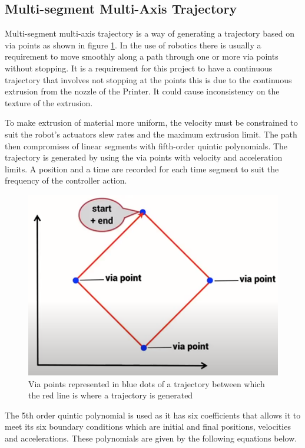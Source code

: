 \documentclass{UoNMCHA}
\numberwithin{equation}{section}
\begin{document}
	\subsection{Multi-segment Multi-Axis Trajectory}
Multi-segment multi-axis trajectory is a way of generating a trajectory based on via points as shown in figure \ref{figs/Picture10}. In the use of robotics there is usually a requirement to move smoothly along a path through one or more via points without stopping. It is a requirement for this project to have a continuous trajectory that involves not stopping at the points this is due to the continuous extrusion from the nozzle of the Printer. It could cause inconsistency on the texture of the extrusion.  \par
To make extrusion of material more uniform, the velocity must be constrained to suit the robot's actuators slew rates and the maximum extrusion limit. The path then compromises of linear segments with fifth-order quintic polynomials. The trajectory is generated by using the via points with velocity and acceleration limits. A position and a time are recorded for each time segment to suit the frequency of the controller action.
	\begin{figure}[H]
		\begin{center}
			\includegraphics[width=.6\linewidth]{figs/Picture10}
			\caption{Via points represented in blue dots of a trajectory between which the red line is where a trajectory is generated \cite{corke_2017_robotics}}
			\label{figs/Picture10}
		\end{center}
	\end{figure}
	
	
	The 5th order quintic polynomial is used as it has six coefficients that allows it to meet its six boundary conditions which are initial and final positions, velocities and accelerations. These polynomials are
	given by the following equations below.
	
\end{document}
